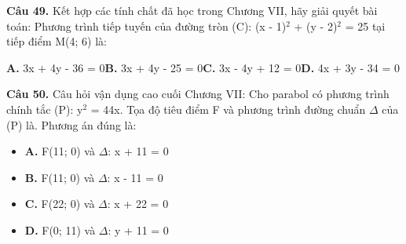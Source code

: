 \documentclass[11pt,a4paper]{article}
\begin{document}
\textbf{\color{primary} Câu 49.} Kết hợp các tính chất đã học trong Chương VII, hãy giải quyết bài toán: Phương trình tiếp tuyến của đường tròn (C): (x - 1)$^2$ + (y - 2)$^2$ = 25 tại tiếp điểm M(4; 6) là:\par
\hspace*{1.5em}\textbf{A.} 3x + 4y - 36 = 0\quad\quad \textbf{B.} 3x + 4y - 25 = 0\quad\quad \textbf{C.} 3x - 4y + 12 = 0\quad\quad \textbf{D.} 4x + 3y - 34 = 0\par\vspace{2pt}
\textbf{\color{primary} Câu 50.} Câu hỏi vận dụng cao cuối Chương VII: Cho parabol có phương trình chính tắc (P): y$^2$ = 44x. Tọa độ tiêu điểm F và phương trình đường chuẩn $\Delta$ của (P) là. Phương án đúng là:\par
\begin{itemize}\setlength{\itemsep}{1pt}\setlength{\parskip}{0pt}
  \item[] \textbf{A.} F(11; 0) và $\Delta$: x + 11 = 0
  \item[] \textbf{B.} F(11; 0) và $\Delta$: x - 11 = 0
  \item[] \textbf{C.} F(22; 0) và $\Delta$: x + 22 = 0
  \item[] \textbf{D.} F(0; 11) và $\Delta$: y + 11 = 0
\end{itemize}\vspace{2pt}
\end{document}
